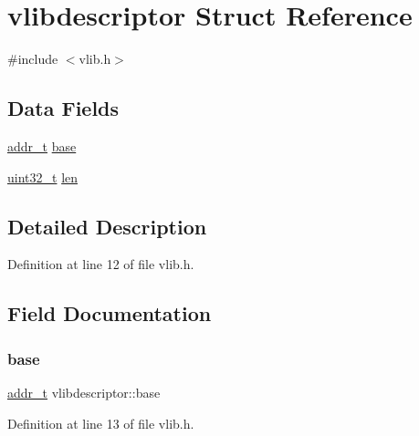 \hypertarget{a00270}{}\section{vlibdescriptor Struct Reference}
\label{a00270}


{\ttfamily \#include $<$vlib.\+h$>$}

\subsection*{Data Fields}
\begin{DoxyCompactItemize}
\item 
\hyperlink{a00125_a295f71165288684c38c6bb836fbb3c59_a295f71165288684c38c6bb836fbb3c59}{addr\+\_\+t} \hyperlink{a00270_a0a6151ac18d60c648baec065efc9af1a_a0a6151ac18d60c648baec065efc9af1a}{base}
\item 
\hyperlink{a00125_a435d1572bf3f880d55459d9805097f62_a435d1572bf3f880d55459d9805097f62}{uint32\+\_\+t} \hyperlink{a00270_a1cebf64c2c1ec72bca5cf673be70b3a7_a1cebf64c2c1ec72bca5cf673be70b3a7}{len}
\end{DoxyCompactItemize}


\subsection{Detailed Description}


Definition at line 12 of file vlib.\+h.



\subsection{Field Documentation}
\mbox{\label{a00270_a0a6151ac18d60c648baec065efc9af1a_a0a6151ac18d60c648baec065efc9af1a}} 
\subsubsection{\texorpdfstring{base}{base}}
{\footnotesize\ttfamily \hyperlink{a00125_a295f71165288684c38c6bb836fbb3c59_a295f71165288684c38c6bb836fbb3c59}{addr\+\_\+t} vlibdescriptor\+::base}



Definition at line 13 of file vlib.\+h.

\mbox{\label{a00270_a1cebf64c2c1ec72bca5cf673be70b3a7_a1cebf64c2c1ec72bca5cf673be70b3a7}} 
